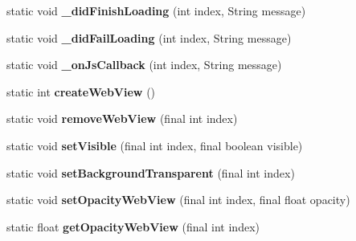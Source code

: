 \begin{DoxyCompactItemize}
static void {\bfseries \+\_\+did\+Finish\+Loading} (int index, String message)
\item 
\mbox{\label{classorg_1_1cocos2dx_1_1lib_1_1Cocos2dxWebViewHelper_aa9569bec5a7db93c2163920a2dfebb62}} 
static void {\bfseries \+\_\+did\+Fail\+Loading} (int index, String message)
\item 
\mbox{\label{classorg_1_1cocos2dx_1_1lib_1_1Cocos2dxWebViewHelper_a28cb2e2c8d11f1150961c8d6da4fc8cf}} 
static void {\bfseries \+\_\+on\+Js\+Callback} (int index, String message)
\item 
\mbox{\label{classorg_1_1cocos2dx_1_1lib_1_1Cocos2dxWebViewHelper_aeeedf5f1ba9946c913efb2c861bc2964}} 
static int {\bfseries create\+Web\+View} ()
\item 
\mbox{\label{classorg_1_1cocos2dx_1_1lib_1_1Cocos2dxWebViewHelper_a3a55b76b5fef1bb34530eb850286a5a9}} 
static void {\bfseries remove\+Web\+View} (final int index)
\item 
\mbox{\label{classorg_1_1cocos2dx_1_1lib_1_1Cocos2dxWebViewHelper_ab3519c18b475132cd59f28b1fb2016d9}} 
static void {\bfseries set\+Visible} (final int index, final boolean visible)
\item 
\mbox{\label{classorg_1_1cocos2dx_1_1lib_1_1Cocos2dxWebViewHelper_aa7e6bda0cc632b26d15139cffb419b3e}} 
static void {\bfseries set\+Background\+Transparent} (final int index)
\item 
\mbox{\label{classorg_1_1cocos2dx_1_1lib_1_1Cocos2dxWebViewHelper_ad5f70be244ddc1b2829d50225a5737c8}} 
static void {\bfseries set\+Opacity\+Web\+View} (final int index, final float opacity)
\item 
\mbox{\label{classorg_1_1cocos2dx_1_1lib_1_1Cocos2dxWebViewHelper_a3097fad244b7a666767165bcf4aaa4bd}} 
static float {\bfseries get\+Opacity\+Web\+View} (final int index)

\end{DoxyCompactItemize}
